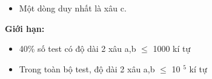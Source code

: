 \begin{itemize}
	\item     Một dòng duy nhất là xâu c.   
\end{itemize}

\textbf{     Giới hạn:    }
\begin{itemize}
	\item     40\% số test có độ dài 2 xâu a,b  $\le$  1000 kí tự   
	\item     Trong toàn bộ test, độ dài 2 xâu a,b  $\le$  10    $^     5    $    kí tự   
\end{itemize}
